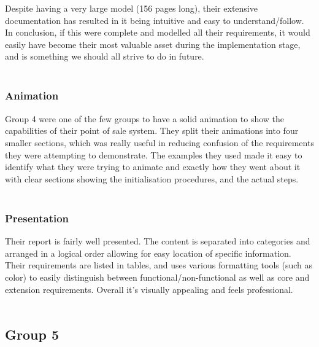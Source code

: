 \documentclass[a4paper]{article}
\begin{document}
Despite having a very large model (156 pages long), their extensive documentation has resulted in it being intuitive and easy to understand/follow. In conclusion, if this were complete and modelled all their requirements, it would easily have become their most valuable asset during the implementation stage, and is something we should all strive to do in future. 
\\\\
\subsubsection{Animation}
Group 4 were one of the few groups to have a solid animation to show the capabilities of their point of sale system. They split their animations into four smaller sections, which was really useful in reducing confusion of the requirements they were attempting to demonstrate. 
The examples they used made it easy to identify what they were trying to animate and exactly how they went about it with clear sections showing the initialisation procedures, and the actual steps.
\\\\
\subsubsection{Presentation}
Their report is fairly well presented. The content is separated into categories and arranged in a logical order allowing for easy location of specific information. Their requirements are listed in tables, and uses various formatting tools (such as color) to easily distinguish between functional/non-functional as well as core and extension requirements. Overall it’s visually appealing and feels professional. 
\\\\

\pagebreak
\subsection{Group 5}
\end{document}
